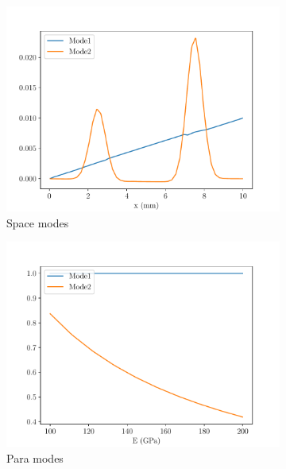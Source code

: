 \begin{figure}
\begin{subfigure}[t]{0.5\linewidth}
    \centering
    \includegraphics[width=\linewidth]{Figures/Pre_trained_Space_modes2BCs_AllFrozen.pdf}
    \caption{Space modes}
\end{subfigure}
  \begin{subfigure}[t]{0.5\linewidth}
    \centering
    \includegraphics[width=\linewidth]{Figures/Pre_trained_Para_modes2BCs_AllFrozen.pdf}
    \caption{Para modes}
\end{subfigure}  
  \begin{subfigure}[t]{0.5\linewidth}
    \centering

\end{subfigure}
\end{figure}
